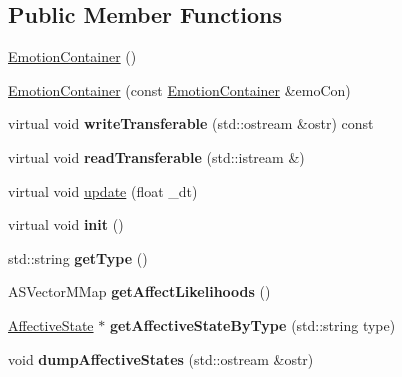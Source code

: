 \subsection*{\-Public \-Member \-Functions}
\begin{DoxyCompactItemize}
\item 
\hyperlink{class_emotion_container_a0cd2f36521f30b93582231d00c3ee8e9}{\-Emotion\-Container} ()
\item 
\hyperlink{class_emotion_container_ab47c17d4f7ce7d862fdf278d7878bdcf}{\-Emotion\-Container} (const \hyperlink{class_emotion_container}{\-Emotion\-Container} \&emo\-Con)
\item 
\hypertarget{class_emotion_container_a70d9dd45542e029d4eba3dcbddf1b717}{
virtual void {\bfseries write\-Transferable} (std\-::ostream \&ostr) const }
\label{class_emotion_container_a70d9dd45542e029d4eba3dcbddf1b717}

\item 
\hypertarget{class_emotion_container_a33d17071e475f57c9856f69464eb4db5}{
virtual void {\bfseries read\-Transferable} (std\-::istream \&)}
\label{class_emotion_container_a33d17071e475f57c9856f69464eb4db5}

\item 
virtual void \hyperlink{class_emotion_container_a8c63f4c9e9c558b4cecdf1aab9c81bd0}{update} (float \-\_\-dt)
\item 
\hypertarget{class_emotion_container_a962cd6110a2793a2d5c4582ad0904b78}{
virtual void {\bfseries init} ()}
\label{class_emotion_container_a962cd6110a2793a2d5c4582ad0904b78}

\item 
\hypertarget{class_emotion_container_abd39cb9d11335f30eff2392f93b73a3d}{
std\-::string {\bfseries get\-Type} ()}
\label{class_emotion_container_abd39cb9d11335f30eff2392f93b73a3d}

\item 
\hypertarget{class_emotion_container_a547c9f7cde3d3408ea0811a28395e3e8}{
\-A\-S\-Vector\-M\-Map {\bfseries get\-Affect\-Likelihoods} ()}
\label{class_emotion_container_a547c9f7cde3d3408ea0811a28395e3e8}

\item 
\hypertarget{class_emotion_container_a628c9fcecdf630c159c336b6197a2134}{
\hyperlink{class_affective_state}{\-Affective\-State} $\ast$ {\bfseries get\-Affective\-State\-By\-Type} (std\-::string type)}
\label{class_emotion_container_a628c9fcecdf630c159c336b6197a2134}

\item 
\hypertarget{class_emotion_container_a5a1cf35a1c16bae3d44ce4311256994c}{
void {\bfseries dump\-Affective\-States} (std\-::ostream \&ostr)}
\label{class_emotion_container_a5a1cf35a1c16bae3d44ce4311256994c}


\end{DoxyCompactItemize}
